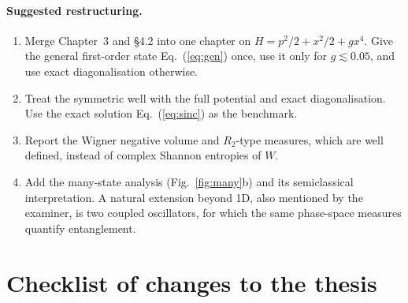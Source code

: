 \documentclass[11pt,a4paper]{article}
\newcommand{\Eq}[1]{Eq.~(#1)}
\begin{document}
\paragraph{Suggested restructuring.}
\begin{enumerate}
\item Merge Chapter~3 and \S4.2 into one chapter on $H=p^2/2+x^2/2+gx^4$. Give the general
  first-order state \Eq{\ref{eq:gen}} once, use it only for $g\lesssim0.05$, and use exact
  diagonalisation otherwise.
\item Treat the symmetric well with the full potential and exact diagonalisation. Use the
  exact solution \Eq{\ref{eq:sinc}} as the benchmark.
\item Report the Wigner negative volume and $R_2$-type measures, which are well defined,
  instead of complex Shannon entropies of $W$.
\item Add the many-state analysis (Fig.~\ref{fig:many}b) and its semiclassical
  interpretation. A natural extension beyond 1D, also mentioned by the examiner, is two
  coupled oscillators, for which the same phase-space measures quantify entanglement.
\end{enumerate}

\section{Checklist of changes to the thesis}
\label{sec:checklist}
\end{document}

